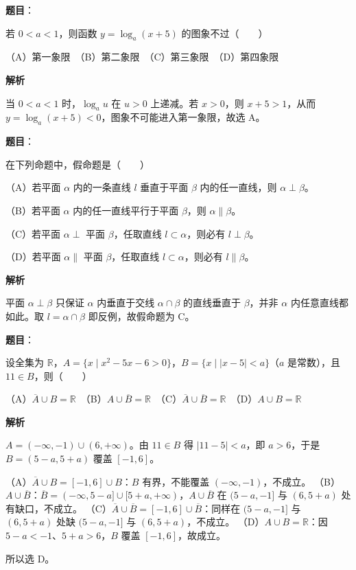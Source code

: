 \begin{answer}

\textbf{题目}：

若 $0<a<1$，则函数 $y=\log_a(x+5)$ 的图象不过\mbox{（　　）}

（A）第一象限　（B）第二象限　（C）第三象限　（D）第四象限

\textbf{解析}

当 $0<a<1$ 时，$\log_a u$ 在 $u>0$ 上递减。若 $x>0$，则 $x+5>1$，从而 $y=\log_a(x+5)<0$，图象不可能进入第一象限，故选 A。


\end{answer}
\begin{answer}

\textbf{题目}：

在下列命题中，假命题是\mbox{（　　）}

（A）若平面 $\alpha$ 内的一条直线 $l$ 垂直于平面 $\beta$ 内的任一直线，则 $\alpha\perp\beta$。

（B）若平面 $\alpha$ 内的任一直线平行于平面 $\beta$，则 $\alpha\parallel\beta$。

（C）若平面 $\alpha\perp$ 平面 $\beta$，任取直线 $l\subset\alpha$，则必有 $l\perp\beta$。

（D）若平面 $\alpha\parallel$ 平面 $\beta$，任取直线 $l\subset\alpha$，则必有 $l\parallel\beta$。

\textbf{解析}

平面 $\alpha\perp\beta$ 只保证 $\alpha$ 内垂直于交线 $\alpha\cap\beta$ 的直线垂直于 $\beta$，并非 $\alpha$ 内任意直线都如此。取 $l=\alpha\cap\beta$ 即反例，故假命题为 C。


\end{answer}
\begin{answer}

\textbf{题目}：

设全集为 $\mathbb R$，$A=\{x\mid x^2-5x-6>0\}$，$B=\{x\mid |x-5|<a\}$（$a$ 是常数），且 $11\in B$，则\mbox{（　　）}

（A）$\overline A\cup B=\mathbb R$　（B）$A\cup\overline B=\mathbb R$　（C）$\overline A\cup\overline B=\mathbb R$　（D）$A\cup B=\mathbb R$

\textbf{解析}

$A=(-\infty,-1)\cup(6,+\infty)$。由 $11\in B$ 得 $|11-5|<a$，即 $a>6$，于是 $B=(5-a,5+a)$ 覆盖 $[-1,6]$。

（A）$\overline A\cup B=[-1,6]\cup B$：$B$ 有界，不能覆盖 $(-\infty,-1)$，不成立。
（B）$A\cup\overline B$：$\overline B=(-\infty,5-a]\cup[5+a,+\infty)$，$A\cup\overline B$ 在 $(5-a,-1]$ 与 $(6,5+a)$ 处有缺口，不成立。
（C）$\overline A\cup\overline B=[-1,6]\cup\overline B$：同样在 $(5-a,-1]$ 与 $(6,5+a)$ 处缺 $(5-a,-1]$ 与 $(6,5+a)$，不成立。
（D）$A\cup B=\mathbb R$：因 $5-a<-1$、$5+a>6$，$B$ 覆盖 $[-1,6]$，故成立。

所以选 D。


\end{answer}
